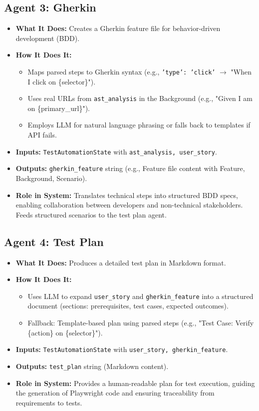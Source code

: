 \documentclass{article}
\begin{document}
\subsection{Agent 3: Gherkin}
\begin{itemize}
    \item \textbf{What It Does:} Creates a Gherkin feature file for behavior-driven development (BDD).
    \item \textbf{How It Does It:} 
        \begin{itemize}
            \item Maps parsed steps to Gherkin syntax (e.g., \texttt{'type': 'click'} $\rightarrow$ "When I click on \{selector\}").
            \item Uses real URLs from \texttt{ast\_analysis} in the Background (e.g., "Given I am on \{primary\_url\}").
            \item Employs LLM for natural language phrasing or falls back to templates if API fails.
        \end{itemize}
    \item \textbf{Inputs:} \texttt{TestAutomationState} with \texttt{ast\_analysis, user\_story}.
    \item \textbf{Outputs:} \texttt{gherkin\_feature} string (e.g., Feature file content with Feature, Background, Scenario).
    \item \textbf{Role in System:} Translates technical steps into structured BDD specs, enabling collaboration between developers and non-technical stakeholders. Feeds structured scenarios to the test plan agent.
\end{itemize}

\subsection{Agent 4: Test Plan}
\begin{itemize}
    \item \textbf{What It Does:} Produces a detailed test plan in Markdown format.
    \item \textbf{How It Does It:} 
        \begin{itemize}
            \item Uses LLM to expand \texttt{user\_story} and \texttt{gherkin\_feature} into a structured document (sections: prerequisites, test cases, expected outcomes).
            \item Fallback: Template-based plan using parsed steps (e.g., "Test Case: Verify \{action\} on \{selector\}").
        \end{itemize}
    \item \textbf{Inputs:} \texttt{TestAutomationState} with \texttt{user\_story, gherkin\_feature}.
    \item \textbf{Outputs:} \texttt{test\_plan} string (Markdown content).
    \item \textbf{Role in System:} Provides a human-readable plan for test execution, guiding the generation of Playwright code and ensuring traceability from requirements to tests.
\end{itemize}
\end{document}
